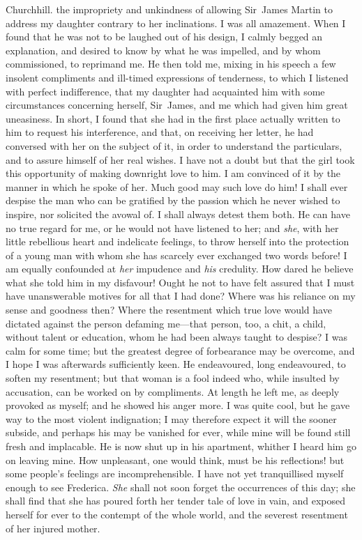 \begin{mail}{Churchhill.}{}
the impropriety and unkindness of allowing Sir~James Martin to address my daughter contrary to her inclinations. I was all amazement. When I found that he was not to be laughed out of his design, I calmly begged an explanation, and desired to know by what he was impelled, and by whom commissioned, to reprimand me. He then told me, mixing in his speech a few insolent compliments and ill-timed expressions of tenderness, to which I listened with perfect indifference, that my daughter had acquainted him with some circumstances concerning herself, Sir~James, and me which had given him great uneasiness. In short, I found that she had in the first place actually written to him to request his interference, and that, on receiving her letter, he had conversed with her on the subject of it, in order to understand the particulars, and to assure himself of her real wishes. I have not a doubt but that the girl took this opportunity of making downright love to him. I am convinced of it by the manner in which he spoke of her. Much good may such love do him! I shall ever despise the man who can be gratified by the passion which he never wished to inspire, nor solicited the avowal of. I shall always detest them both. He can have no true regard for me, or he would not have listened to her; and \textit{she}, with her little rebellious heart and indelicate feelings, to throw herself into the protection of a young man with whom she has scarcely ever exchanged two words before! I am equally confounded at \textit{her} impudence and \textit{his} credulity. How dared he believe what she told him in my disfavour! Ought he not to have felt assured that I must have unanswerable motives for all that I had done? Where was his reliance on my sense and goodness then? Where the resentment which true love would have dictated against the person defaming me—that person, too, a chit, a child, without talent or education, whom he had been always taught to despise? I was calm for some time; but the greatest degree of forbearance may be overcome, and I hope I was afterwards sufficiently keen. He endeavoured, long endeavoured, to soften my resentment; but that woman is a fool indeed who, while insulted by accusation, can be worked on by compliments. At length he left me, as deeply provoked as myself; and he showed his anger more. I was quite cool, but he gave way to the most violent indignation; I may therefore expect it will the sooner subside, and perhaps his may be vanished for ever, while mine will be found still fresh and implacable. He is now shut up in his apartment, whither I heard him go on leaving mine. How unpleasant, one would think, must be his reflections! but some people's feelings are incomprehensible. I have not yet tranquillised myself enough to see Frederica. \textit{She} shall not soon forget the occurrences of this day; she shall find that she has poured forth her tender tale of love in vain, and exposed herself for ever to the contempt of the whole world, and the severest resentment of her injured mother. 

\end{mail}